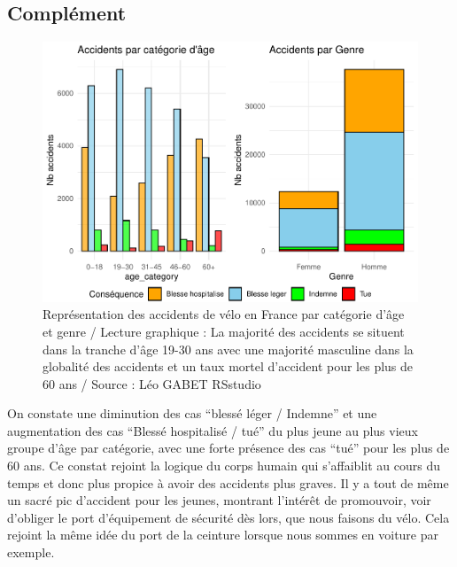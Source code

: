 \documentclass[french,]{compterendu}
\theoremstyle{urcastyle}
\theoremstyle{remark}
\begin{document}
\hypertarget{compluxe9ment}{%
\subsection{Complément}\label{compluxe9ment}}

\begin{figure}[H]

{\centering \includegraphics[width=0.9\linewidth]{Rapport_ADD_LEO-GABET_files/figure-latex/accfranceComple-1} 

}

\caption{Représentation des accidents de vélo en France par catégorie d'âge et genre / Lecture graphique : La majorité des accidents se situent dans la tranche d'âge 19-30 ans avec une majorité masculine dans la globalité des accidents et un taux mortel d'accident pour les plus de 60 ans / Source : Léo GABET RSstudio}\label{fig:accfranceComple}
\end{figure}

On constate une diminution des cas ``blessé léger / Indemne'' et une augmentation des cas ``Blessé hospitalisé / tué'' du plus jeune au plus vieux groupe d'âge par catégorie, avec une forte présence des cas ``tué'' pour les plus de 60 ans. Ce constat rejoint la logique du corps humain qui s'affaiblit au cours du temps et donc plus propice à avoir des accidents plus graves. Il y a tout de même un sacré pic d'accident pour les jeunes, montrant l'intérêt de promouvoir, voir d'obliger le port d'équipement de sécurité dès lors, que nous faisons du vélo. Cela rejoint la même idée du port de la ceinture lorsque nous sommes en voiture par exemple.

\newpage
\end{document}
